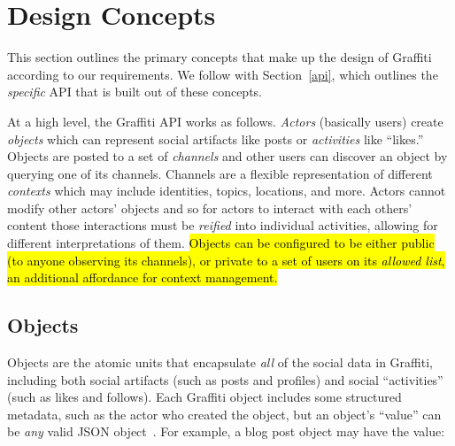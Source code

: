 \section{Design Concepts}
\label{concepts}

This section outlines the primary concepts that make up the design of Graffiti
according to our requirements.
We follow with Section~\ref{api}, which outlines the \emph{specific} API that is built out of these
concepts.

At a high level, the Graffiti API works as follows.
\emph{Actors} (basically users) create \emph{objects} which can represent
social artifacts like posts or \emph{activities} like ``likes.''
Objects are posted to a set of \emph{channels} and other users can
discover an object by querying one of its channels. Channels are a flexible representation
of different \emph{contexts} which may include identities, topics, locations,
and more.
Actors cannot modify other actors' objects and so for actors to interact with each others' content
those interactions must be \emph{reified} into individual
activities, %
allowing for different interpretations of them.
\hl{%
Objects can be configured to be either public
(to anyone observing its channels),
or private to a set of users on its \emph{allowed list},
an additional affordance for context management.
}%



\subsection{Objects}
\label{concepts:objects}

Objects are the atomic units that encapsulate \emph{all}
of the social data in Graffiti, including
both social artifacts (such as posts and profiles) and social ``activities'' (such as likes and follows).
Each Graffiti object includes some structured metadata,
such as the actor who created the object,
but an object's ``value'' can be \emph{any} valid JSON object~\cite{json}.
For example, a blog post object may have the value:

